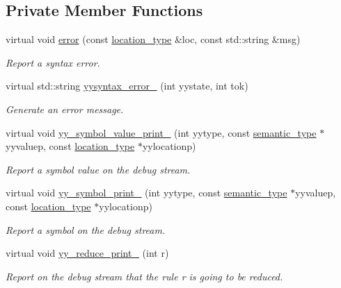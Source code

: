 \subsection*{Private Member Functions}
\begin{DoxyCompactItemize}
\item 
virtual void \hyperlink{classyy_1_1_parser_implementation_a389624597bcda973042837f9fc96397d}{error} (const \hyperlink{classyy_1_1location}{location\_\-type} \&loc, const std::string \&msg)
\begin{DoxyCompactList}\small\item\em Report a syntax error. \end{DoxyCompactList}\item 
virtual std::string \hyperlink{classyy_1_1_parser_implementation_a5c70701c6be99bbbb8f0f466db102b05}{yysyntax\_\-error\_\-} (int yystate, int tok)
\begin{DoxyCompactList}\small\item\em Generate an error message. \end{DoxyCompactList}\item 
virtual void \hyperlink{classyy_1_1_parser_implementation_a2f330cb4d1f85861d3b543f9d957afa9}{yy\_\-symbol\_\-value\_\-print\_\-} (int yytype, const \hyperlink{unionyy_1_1_parser_implementation_1_1semantic__type}{semantic\_\-type} $\ast$yyvaluep, const \hyperlink{classyy_1_1location}{location\_\-type} $\ast$yylocationp)
\begin{DoxyCompactList}\small\item\em Report a symbol value on the debug stream. \end{DoxyCompactList}\item 
virtual void \hyperlink{classyy_1_1_parser_implementation_aa4dc8b7ecd8f0c663a4a1886422db808}{yy\_\-symbol\_\-print\_\-} (int yytype, const \hyperlink{unionyy_1_1_parser_implementation_1_1semantic__type}{semantic\_\-type} $\ast$yyvaluep, const \hyperlink{classyy_1_1location}{location\_\-type} $\ast$yylocationp)
\begin{DoxyCompactList}\small\item\em Report a symbol on the debug stream. \end{DoxyCompactList}\item 
virtual void \hyperlink{classyy_1_1_parser_implementation_a2fec53614def62242a558b0100239398}{yy\_\-reduce\_\-print\_\-} (int r)
\begin{DoxyCompactList}\small\item\em Report on the debug stream that the rule {\itshape r\/} is going to be reduced. \end{DoxyCompactList}\item 

\end{DoxyCompactItemize}
